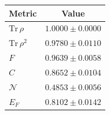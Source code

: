 \begin{tabular}{lc}
\hline
Metric & Value \\
\hline
$\mathrm{Tr}\,\rho$ & $1.0000\pm0.0000$ \\
$\mathrm{Tr}\,\rho^2$ & $0.9780\pm0.0110$ \\
$F$ & $0.9639\pm0.0058$ \\
$C$ & $0.8652\pm0.0104$ \\
$\mathcal{N}$ & $0.4853\pm0.0056$ \\
$E_F$ & $0.8102\pm0.0142$ \\
\hline
\end{tabular}